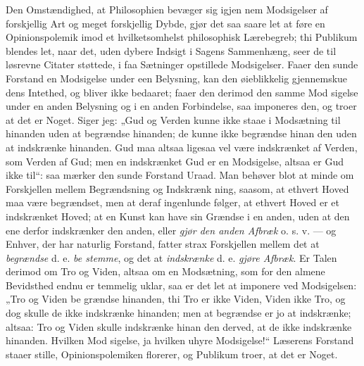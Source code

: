 \documentclass[12pt]{book}
\newcommand{\opage}[1]{\marginnote{\footnotesize\textit{[#1]}}}
\begin{document}
Den Omstændighed, at Philosophien bevæger sig igjen\-%
nem Modsigelser af forskjellig Art og meget forskjellig Dybde,
gjør det saa saare let at føre en Opinionspolemik imod et
hvilketsomhelst philosophisk Lærebegreb; thi Publikum blendes
let, naar det, uden dybere Indsigt i Sagens Sammenhæng,
seer de til løsrevne Citater støttede, i faa Sætninger opstillede
Modsigelser. Faaer den sunde Forstand en Modsigelse under
een Belysning, kan den øieblikkelig gjennemskue dens Intethed,
og bliver ikke bedaaret; faaer den derimod den samme Mod\-%
sigelse under en anden Belysning og i en anden Forbindelse,
saa imponeres den, og troer at det er Noget. Siger jeg:
„Gud og Verden kunne ikke staae i Modsætning til hinanden
uden at begrændse hinanden; de kunne ikke begrændse hinan\-%
den uden at indskrænke hinanden. Gud maa altsaa ligesaa
vel være indskrænket af Verden, som Verden af Gud; men
en indskrænket Gud er en Modsigelse, altsaa er Gud ikke til“:
saa mærker den sunde Forstand Uraad. Man behøver blot
at minde om Forskjellen mellem Begrændsning og Indskrænk\-%
ning, saasom, at ethvert Hoved maa være begrændset, men
at deraf ingenlunde følger, at ethvert Hoved er et indskrænket
Hoved; at en Kunst kan have sin Grændse i en anden, uden
at den ene derfor indskrænker den anden, eller \emph{gjør den
anden Afbræk} o. s. v. --- og Enhver, der har naturlig Forstand,
fatter strax Forskjellen mellem det at \emph{begrændse} d. e. \emph{be\-%
stemme}, og det at \emph{indskrænke} d. e. \emph{gjøre Afbræk}. Er
Talen derimod om Tro og Viden, altsaa om en Modsætning, som
for den almene Bevidsthed endnu er temmelig uklar, saa er
det let at imponere ved Modsigelsen: „Tro og Viden be\-%
\opage{325}\setcounter{footnote}{0}%
grændse hinanden, thi Tro er ikke Viden, Viden ikke Tro, og
dog skulle de ikke indskrænke hinanden; men at begrændse er jo
at indskrænke; altsaa: Tro og Viden skulle indskrænke hinan\-%
den derved, at de ikke indskrænke hinanden. Hvilken Mod\-%
sigelse, ja hvilken uhyre Modsigelse!“ Læserens Forstand staaer
stille, Opinionspolemiken florerer, og Publikum troer, at det
er Noget.
\end{document}
